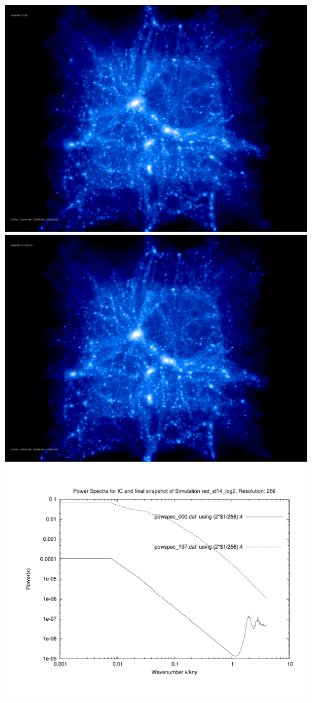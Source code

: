 \includegraphics[scale=0.1]{r256/h70/red_st14_log2/150.jpg} 
\includegraphics[scale=0.1]{r256/h70/red_st14_log2/197.jpg} \\ 

\includegraphics[scale=0.5]{r256/h70/red_st14_log2/plot_powspec_red_st14_log2.pdf}


